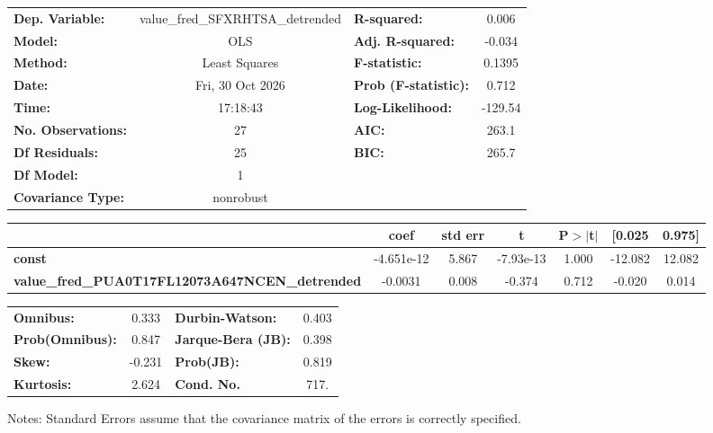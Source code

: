 \begin{center}
\begin{tabular}{lclc}
\toprule
\textbf{Dep. Variable:}                                 & value\_fred\_SFXRHTSA\_detrended & \textbf{  R-squared:         } &     0.006   \\
\textbf{Model:}                                         &               OLS                & \textbf{  Adj. R-squared:    } &    -0.034   \\
\textbf{Method:}                                        &          Least Squares           & \textbf{  F-statistic:       } &    0.1395   \\
\textbf{Date:}                                          &         Fri, 30 Oct 2026         & \textbf{  Prob (F-statistic):} &    0.712    \\
\textbf{Time:}                                          &             17:18:43             & \textbf{  Log-Likelihood:    } &   -129.54   \\
\textbf{No. Observations:}                              &                  27              & \textbf{  AIC:               } &     263.1   \\
\textbf{Df Residuals:}                                  &                  25              & \textbf{  BIC:               } &     265.7   \\
\textbf{Df Model:}                                      &                   1              & \textbf{                     } &             \\
\textbf{Covariance Type:}                               &            nonrobust             & \textbf{                     } &             \\
\bottomrule
\end{tabular}
\begin{tabular}{lcccccc}
                                                        & \textbf{coef} & \textbf{std err} & \textbf{t} & \textbf{P$> |$t$|$} & \textbf{[0.025} & \textbf{0.975]}  \\
\midrule
\textbf{const}                                          &   -4.651e-12  &        5.867     & -7.93e-13  &         1.000        &      -12.082    &       12.082     \\
\textbf{value\_fred\_PUA0T17FL12073A647NCEN\_detrended} &      -0.0031  &        0.008     &    -0.374  &         0.712        &       -0.020    &        0.014     \\
\bottomrule
\end{tabular}
\begin{tabular}{lclc}
\textbf{Omnibus:}       &  0.333 & \textbf{  Durbin-Watson:     } &    0.403  \\
\textbf{Prob(Omnibus):} &  0.847 & \textbf{  Jarque-Bera (JB):  } &    0.398  \\
\textbf{Skew:}          & -0.231 & \textbf{  Prob(JB):          } &    0.819  \\
\textbf{Kurtosis:}      &  2.624 & \textbf{  Cond. No.          } &     717.  \\
\bottomrule
\end{tabular}
\end{center}

Notes: \newline
 [1] Standard Errors assume that the covariance matrix of the errors is correctly specified.